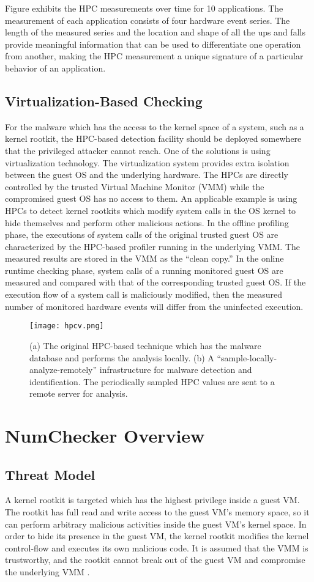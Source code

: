 \documentclass[12pt]{report}
\begin{document}
Figure exhibits the HPC measurements over time for 10 applications. The measurement of each application consists of four hardware event series.
The length of the measured series and the location and shape of all the ups and falls
provide meaningful information that can be used to differentiate one operation from
another, making the HPC measurement a unique signature of a particular behavior of
an application.

\section{Virtualization-Based Checking}
For the malware which has the access to the kernel space of a system, such as a
kernel rootkit, the HPC-based detection facility should be deployed somewhere that
the privileged attacker cannot reach. One of the solutions is using virtualization
technology. The virtualization system provides extra isolation between the guest OS
and the underlying hardware. The HPCs are directly controlled by the trusted Virtual
Machine Monitor (VMM) while the compromised guest OS has no access to them.
An applicable example is using HPCs to detect kernel rootkits which modify system
calls in the OS kernel to hide themselves and perform other malicious actions. In the offline profiling phase, the executions of system calls of the
original trusted guest OS are characterized by the HPC-based profiler running in the
underlying VMM. The measured results are stored in the VMM as the “clean copy.”
In the online runtime checking phase, system calls of a running monitored guest OS
are measured and compared with that of the corresponding trusted guest OS. If the
execution flow of a system call is maliciously modified, then the measured number of
monitored hardware events will differ from the uninfected execution.

\begin{figure}[h]
\centering
\texttt{[image: hpcv.png]}
\caption{(a) The original HPC-based technique which has the malware database and performs the analysis
locally. (b) A “sample-locally-analyze-remotely” infrastructure for malware detection and identification. The
periodically sampled HPC values are sent to a remote server for analysis.}
\end{figure}

\chapter {NumChecker Overview}
\section{Threat Model}
A kernel rootkit is targeted which has the highest privilege
inside a guest VM. The rootkit has full read and write
access to the guest VM’s memory space, so it can perform
arbitrary malicious activities inside the guest VM’s kernel
space. In order to hide its presence in the guest VM, the kernel
rootkit modifies the kernel control-flow and executes its own
malicious code. It is assumed that the VMM is trustworthy, and
the rootkit cannot break out of the guest VM and compromise
the underlying VMM .
\end{document}
